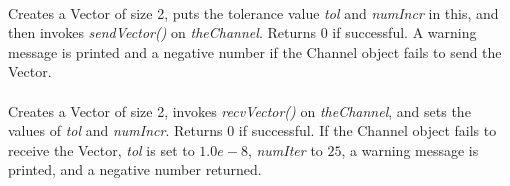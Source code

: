 \\ 
Creates a Vector of size 2, puts the tolerance value {\em tol} and {\em numIncr}
in this, and then invokes {\em sendVector()} on {\em
theChannel}. Returns $0$ if successful. A warning message is printed
and a negative number if the Channel object fails to send the Vector.\\ 

\\ 
Creates a Vector of size 2, invokes {\em recvVector()} on {\em
theChannel}, and sets the values of {\em tol} and {\em numIncr}.
Returns $0$ if successful. If the Channel object fails to receive the
Vector, {\em tol} is set to $1.0e-8$, {\em numIter} to $25$, a warning
message is printed, and a negative number returned.
